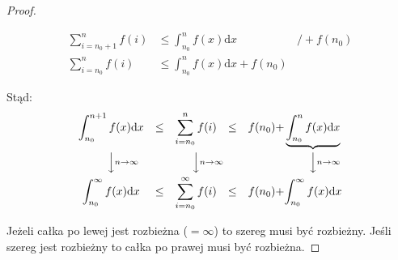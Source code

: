 \documentclass{article}
\theoremstyle{definition}
\theoremstyle{case}
\begin{document}
\begin{proof}
\begin{multicols}{2}
								\begin{equation*}
									\begin{aligned}
										\sum_{i=n_0+1}^n f(i) & \leq \int_{n_0}^n f(x) \mathrm{d}x & \Big/ + f(n_0)
										\\\sum_{i=n_0}^n f(i) & \leq \int_{n_0}^nf(x) \mathrm{d}x + f(n_0) &
									\end{aligned}
								\end{equation*}
							\end{multicols}
							Stąd:
							\begin{equation*}
								\begin{CD}
									\displaystyle\int_{n_0}^{n+1}f(x) \mathrm{d}x @.
									\quad \leq \quad @.
									\displaystyle\sum_{i=n_0}^nf(i) @.
									\quad \leq \quad @.
									f(n_0) + @. \underbrace{\int_{n_0}^nf(x) \mathrm{d}x}
									\\ @VV{n \to \infty}V @. @VV{n \to \infty}V @. @. @VV{n \to \infty}V
									\\ \displaystyle\int_{n_0}^\infty f(x) \mathrm{d}x @.
									\quad \leq \quad @.
									\displaystyle\sum_{i=n_0}^\infty f(i) @.
									\leq @. f(n_0) +
									@. \displaystyle\int_{n_0}^\infty f(x) \mathrm{d}x
								\end{CD}
							\end{equation*}

							Jeżeli całka po lewej jest rozbieżna ($=\infty$) to szereg musi być rozbieżny.
							Jeśli szereg jest rozbieżny to całka po prawej musi być rozbieżna.
						\end{proof}
\end{document}
